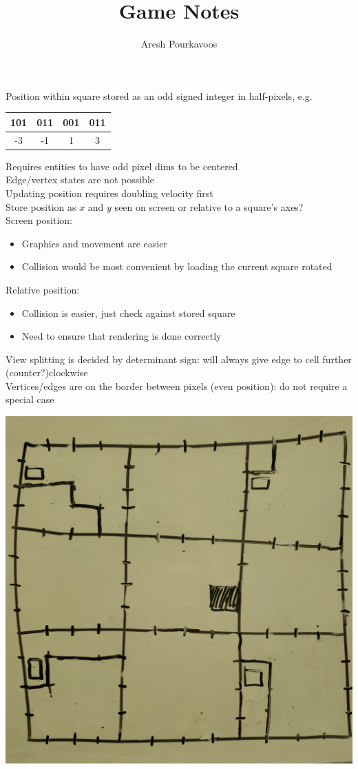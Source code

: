 \documentclass{article}
\begin{document}
\title{Game Notes}
\author{Aresh Pourkavoos}
\maketitle

Position within square stored as an odd signed integer in half-pixels,
e.g.
\begin{center}
  \begin{tabular}{|c|c|c|c|}
    \hline
    101 & 011 & 001 & 011 \\ \hline
    -3 & -1 & 1 & 3 \\ \hline
  \end{tabular}
\end{center}
Requires entities to have odd pixel dims to be centered \\
Edge/vertex states are not possible \\
Updating position requires doubling velocity first \\
Store position as $x$ and $y$ seen on screen
or relative to a square's axes? \\
Screen position: 
\begin{itemize}
\item
  Graphics and movement are easier
\item
  Collision would be most convenient by loading the current square rotated
\end{itemize}
Relative position:
\begin{itemize}
\item
  Collision is easier, just check against stored square
\item
  Need to ensure that rendering is done correctly
\end{itemize}
View splitting is decided by determinant sign:
will always give edge to cell further (counter?)clockwise \\
Vertices/edges are on the border between pixels (even position):
do not require a special case
\begin{center}
  \includegraphics[width=0.5\linewidth]{grid.jpg}
\end{center}
\end{document}
